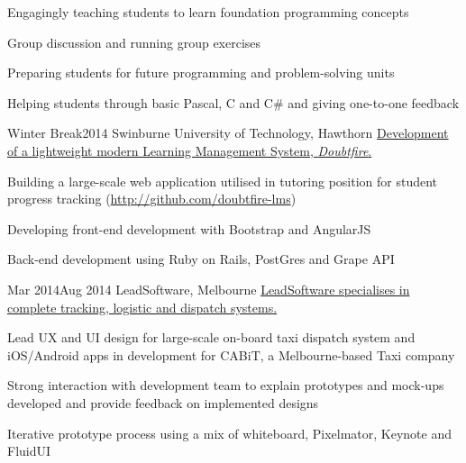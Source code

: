 {        {
          \item Engagingly teaching students to learn foundation programming concepts
          \item Group discussion and running group exercises
          \item Preparing students for future programming and problem-solving units
          \item Helping students through basic Pascal, C and C# and giving one-to-one feedback
        }
        {Winter Break}{2014}
        {Swinburne University of Technology, Hawthorn}
        {\href{http://alexcu.me/#modal-doubtfire}{Development of a lightweight modern Learning Management System, \emph{Doubtfire}.}}
        {
            \item Building a large-scale web application utilised in tutoring position for student progress tracking (\href{http://github.com/doubtfire-lms}{http://github.com/doubtfire-lms})
            \item Developing front-end development with Bootstrap and AngularJS
            \item Back-end development using Ruby on Rails, PostGres and Grape API
        }
        {Mar 2014}{Aug 2014}
        {LeadSoftware, Melbourne}
        {\href{http://www.leadsoftware.com.au/}{LeadSoftware specialises in complete tracking, logistic and dispatch systems.}}
        {
          \item Lead UX and UI design for large-scale on-board taxi dispatch system and iOS/Android apps in development for CABiT, a Melbourne-based Taxi company
          \item Strong interaction with development team to explain prototypes and mock-ups developed and provide feedback on implemented designs
          \item Iterative prototype process using a mix of whiteboard, Pixelmator, Keynote and FluidUI
        }
}
